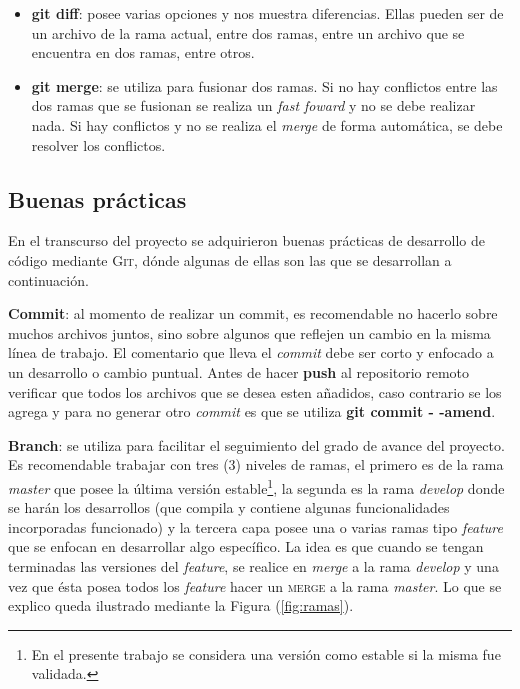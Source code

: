 \begin{itemize}
	\item \textbf{git diff}: posee varias opciones y nos muestra diferencias. Ellas pueden ser de un archivo de la rama actual, entre dos ramas, entre un archivo que se encuentra en dos ramas, entre otros.
	\item \textbf{git merge}: se utiliza para fusionar dos ramas. Si no hay conflictos entre las dos ramas que se fusionan se realiza un \textit{fast foward} y no se debe realizar nada. Si hay conflictos y no se realiza el \textit{merge} de forma automática, se debe resolver los conflictos\footnotemark[3].
\end{itemize}

\subsection{Buenas prácticas}

En el transcurso del proyecto se adquirieron buenas prácticas de desarrollo de código mediante \textsc{Git}, dónde algunas de ellas son las que se desarrollan a continuación.

\textbf{Commit}: al momento de realizar un commit, es recomendable no hacerlo sobre muchos archivos juntos, sino sobre algunos que reflejen un cambio en la misma línea de trabajo. El comentario que lleva el \textit{commit} debe ser corto y enfocado a un desarrollo o cambio puntual. Antes de hacer \textbf{push} al repositorio remoto verificar que todos los archivos que se desea esten añadidos, caso contrario se los agrega y para no generar otro \textit{commit} es que se utiliza \textbf{git commit - -amend}.

\textbf{Branch}: se utiliza para facilitar el seguimiento del grado de avance del proyecto. Es recomendable trabajar con tres (3) niveles de ramas, el primero es de la rama \textit{master} que posee la última versión estable\footnote{En el presente trabajo se considera una versión como estable si la misma fue validada.}, la segunda es la rama \textit{develop} donde se harán los desarrollos (que compila y contiene algunas funcionalidades incorporadas funcionado)
y la tercera capa posee una o varias ramas tipo \textit{feature} que se enfocan en desarrollar algo específico. La idea es que cuando se tengan terminadas las versiones del \textit{feature}, se realice en \textit{merge} a la rama \textit{develop} y una vez que ésta posea todos los \textit{feature} hacer un \textsc{merge} a la rama \textit{master}. Lo que se explico queda ilustrado mediante la Figura (\ref{fig:ramas}).
 
